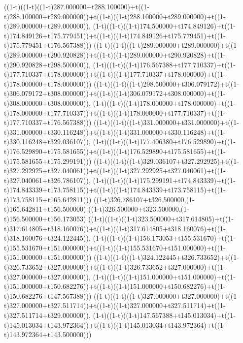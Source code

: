 ((1-t)((1-t)((1-t)287.000000+t288.100000)+t((1-t)288.100000+t289.000000))+t((1-t)((1-t)288.100000+t289.000000)+t((1-t)289.000000+t289.000000)),                                     (1-t)((1-t)((1-t)174.500000+t174.849126)+t((1-t)174.849126+t175.779451))+t((1-t)((1-t)174.849126+t175.779451)+t((1-t)175.779451+t176.567388)))
((1-t)((1-t)((1-t)289.000000+t289.000000)+t((1-t)289.000000+t290.920828))+t((1-t)((1-t)289.000000+t290.920828)+t((1-t)290.920828+t298.500000)),                                     (1-t)((1-t)((1-t)176.567388+t177.710337)+t((1-t)177.710337+t178.000000))+t((1-t)((1-t)177.710337+t178.000000)+t((1-t)178.000000+t178.000000)))
((1-t)((1-t)((1-t)298.500000+t306.079172)+t((1-t)306.079172+t308.000000))+t((1-t)((1-t)306.079172+t308.000000)+t((1-t)308.000000+t308.000000)),                                     (1-t)((1-t)((1-t)178.000000+t178.000000)+t((1-t)178.000000+t177.710337))+t((1-t)((1-t)178.000000+t177.710337)+t((1-t)177.710337+t176.567388)))
((1-t)((1-t)((1-t)331.000000+t331.000000)+t((1-t)331.000000+t330.116248))+t((1-t)((1-t)331.000000+t330.116248)+t((1-t)330.116248+t329.036107)),                                     (1-t)((1-t)((1-t)177.406380+t176.529890)+t((1-t)176.529890+t175.581655))+t((1-t)((1-t)176.529890+t175.581655)+t((1-t)175.581655+t175.299191)))
((1-t)((1-t)((1-t)329.036107+t327.292925)+t((1-t)327.292925+t327.040061))+t((1-t)((1-t)327.292925+t327.040061)+t((1-t)327.040061+t326.786107)),                                     (1-t)((1-t)((1-t)175.299191+t174.843339)+t((1-t)174.843339+t173.758115))+t((1-t)((1-t)174.843339+t173.758115)+t((1-t)173.758115+t165.642811)))
((1-t)326.786107+t326.500000,(1-t)165.642811+t156.500000)
((1-t)326.500000+t323.500000,(1-t)156.500000+t156.173053)
((1-t)((1-t)((1-t)323.500000+t317.614805)+t((1-t)317.614805+t318.160076))+t((1-t)((1-t)317.614805+t318.160076)+t((1-t)318.160076+t324.122445)),                                     (1-t)((1-t)((1-t)156.173053+t155.531670)+t((1-t)155.531670+t151.000000))+t((1-t)((1-t)155.531670+t151.000000)+t((1-t)151.000000+t151.000000)))
((1-t)((1-t)((1-t)324.122445+t326.733652)+t((1-t)326.733652+t327.000000))+t((1-t)((1-t)326.733652+t327.000000)+t((1-t)327.000000+t327.000000)),                                     (1-t)((1-t)((1-t)151.000000+t151.000000)+t((1-t)151.000000+t150.682276))+t((1-t)((1-t)151.000000+t150.682276)+t((1-t)150.682276+t147.567388)))
((1-t)((1-t)((1-t)327.000000+t327.000000)+t((1-t)327.000000+t327.511714))+t((1-t)((1-t)327.000000+t327.511714)+t((1-t)327.511714+t329.000000)),                                     (1-t)((1-t)((1-t)147.567388+t145.013034)+t((1-t)145.013034+t143.972364))+t((1-t)((1-t)145.013034+t143.972364)+t((1-t)143.972364+t143.500000)))
